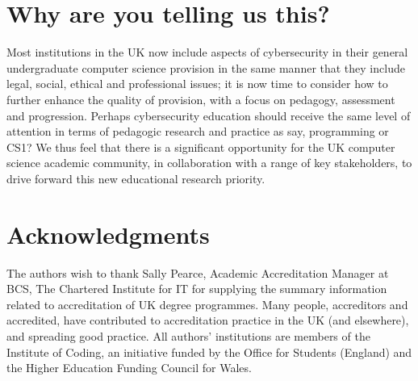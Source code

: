 \documentclass[sigconf]{acmart}
\begin{document}
\begin{comment}
It is the view of the authors that the computer science education community collectively should address these (and other emergent) issues related to the delivery of good quality embedded cybersecurity education.
\end{comment}

\section{Why are you telling us this?}	

Most institutions in the UK now include aspects of cybersecurity
in their general undergraduate computer science provision in the same manner that
they include legal, social, ethical and professional issues; it is now time to
consider how to further enhance the quality of provision, with a focus
on pedagogy, assessment and progression. Perhaps cybersecurity education should
receive the same level of attention in terms of pedagogic research and
practice as say, programming or CS1? We thus feel that there is a significant opportunity for
the UK computer science academic community, in collaboration with a
range of key stakeholders, to drive forward this new educational
research priority.

\section{Acknowledgments}
The authors wish to thank Sally Pearce, Academic Accreditation Manager at BCS, The Chartered Institute for IT for supplying the summary information related to accreditation of UK degree programmes. Many people, accreditors and accredited, have contributed to accreditation practice in the UK (and elsewhere), and spreading good practice.  All authors' institutions are members of the Institute of Coding, an initiative funded by the Office for Students (England) and the Higher Education Funding Council for Wales.

%

\end{document}
